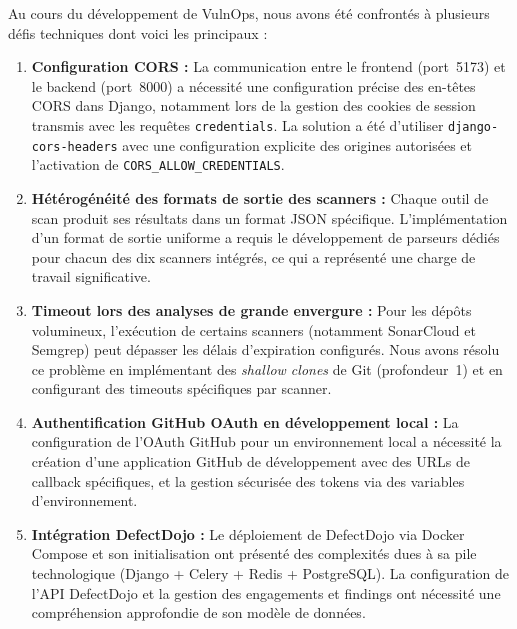 \documentclass[12pt, a4paper, oneside]{report}
\begin{document}
Au cours du développement de VulnOps, nous avons été confrontés à plusieurs
défis techniques dont voici les principaux :

\begin{enumerate}
    \item \textbf{Configuration CORS :} La communication entre le frontend
    (port~5173) et le backend (port~8000) a nécessité une configuration précise
    des en-têtes CORS dans Django, notamment lors de la gestion des cookies de
    session transmis avec les requêtes \texttt{credentials}. La solution a été
    d'utiliser \texttt{django-cors-headers} avec une configuration explicite
    des origines autorisées et l'activation de \texttt{CORS\_ALLOW\_CREDENTIALS}.
    
    \item \textbf{Hétérogénéité des formats de sortie des scanners :}
    Chaque outil de scan produit ses résultats dans un format JSON spécifique.
    L'implémentation d'un format de sortie uniforme a requis le développement
    de parseurs dédiés pour chacun des dix scanners intégrés, ce qui a représenté
    une charge de travail significative.
    
    \item \textbf{Timeout lors des analyses de grande envergure :}
    Pour les dépôts volumineux, l'exécution de certains scanners (notamment SonarCloud
    et Semgrep) peut dépasser les délais d'expiration configurés. Nous avons
    résolu ce problème en implémentant des \textit{shallow clones} de Git
    (profondeur~1) et en configurant des timeouts spécifiques par scanner.
    
    \item \textbf{Authentification GitHub OAuth en développement local :}
    La configuration de l'OAuth GitHub pour un environnement local a nécessité
    la création d'une application GitHub de développement avec des URLs de callback
    spécifiques, et la gestion sécurisée des tokens via des variables d'environnement.
    
    \item \textbf{Intégration DefectDojo :}
    Le déploiement de DefectDojo via Docker Compose et son initialisation ont
    présenté des complexités dues à sa pile technologique (Django + Celery +
    Redis + PostgreSQL). La configuration de l'API DefectDojo et la gestion
    des engagements et findings ont nécessité une compréhension approfondie
    de son modèle de données.
\end{enumerate}
\end{document}
